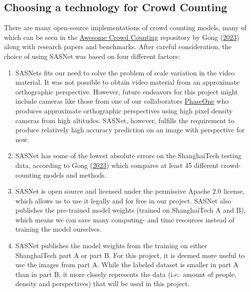 \documentclass[
]{article}
\begin{document}
\hypertarget{sec-model-selection}{%
\subsection{Choosing a technology for Crowd
Counting}\label{sec-model-selection}}

There are many open-source implementations of crowd counting models,
many of which can be seen in the
\href{https://github.com/gjy3035/Awesome-Crowd-Counting}{Awesome Crowd
Counting} repository by Gong
(\protect\hyperlink{ref-gjy3035_awesome_crowd_counting}{2023}) along
with research papers and benchmarks. After careful consideration, the
choice of using SASNet was based on four different factors:

\begin{enumerate}
\def\labelenumi{\arabic{enumi}.}
\item
  SASNets fits our need to solve the problem of scale variation in the
  video material. It was not possible to obtain video material from an
  approximate orthographic perspective. However, future endeavors for
  this project might include cameras like those from one of our
  collaborators \href{https://www.phaseone.com/}{PhaseOne} who produces
  approximate orthographic perspectives using high pixel density cameras
  from high altitudes. SASNet, however, fulfills the requirement to
  produce relatively high accuracy prediction on an image with
  perspective for now.
\item
  SASNet has some of the lowest absolute errors on the ShanghaiTech
  testing data, according to Gong
  (\protect\hyperlink{ref-gjy3035_awesome_crowd_counting}{2023}) which
  compares at least 45 different crowd-counting models and methods.
\item
  SASNet is open source and licensed under the permissive Apache 2.0
  license, which allows us to use it legally and for free in our
  project. SASNet also publishes the pre-trained model weights (trained
  on ShanghaiTech A and B), which means we can save many computing- and
  time resources instead of training the model ourselves.
\item
  SASNet publishes the model weights from the training on either
  ShanghaiTech part A or part B. For this project, it is deemed more
  useful to use the images from part A. While the labeled dataset is
  smaller in part A than in part B, it more closely represents the data
  (i.e.~amount of people, density and perspectives) that will be used in
  this project.
\end{enumerate}
\end{document}
